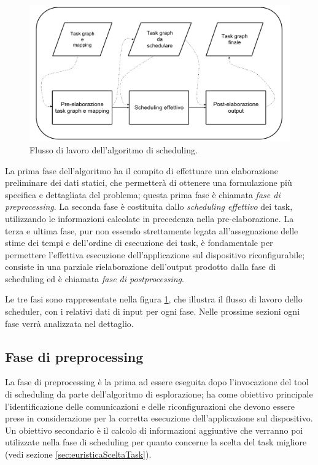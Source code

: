 \begin{figure}[ht]
 \begin{center}
\includegraphics[width=\textwidth]
{capitoli/figure/cap4/SchedulerWorkflow.pdf}
  \caption{Flusso di lavoro dell'algoritmo di scheduling.}
  \label{fig:schedulerWorkflow}
 \end{center}
\end{figure}


La prima fase dell'algoritmo ha il compito di 
effettuare una elaborazione preliminare dei dati statici, che permetterà di 
ottenere una formulazione più specifica e dettagliata del problema; questa 
prima fase è chiamata \emph{fase di preprocessing}. La seconda fase è 
costituita dallo \emph{scheduling effettivo} dei task, utilizzando le 
informazioni calcolate in precedenza nella pre-elaborazione. La terza e ultima 
fase, pur non essendo strettamente legata all'assegnazione delle stime dei tempi 
e dell'ordine di esecuzione dei task, è fondamentale per permettere l'effettiva 
esecuzione dell'applicazione sul dispositivo riconfigurabile; consiste in una 
parziale rielaborazione dell'output prodotto dalla fase di scheduling ed è 
chiamata \emph{fase di postprocessing}.

Le tre fasi sono rappresentate nella figura \ref{fig:schedulerWorkflow}, che 
illustra il flusso di lavoro dello scheduler, con i relativi dati di input per 
ogni fase. Nelle prossime sezioni ogni fase verrà analizzata nel dettaglio.


\subsection{Fase di preprocessing}
\label{subsec:fasePreprocessing}
La fase di preprocessing è la prima ad essere eseguita dopo l'invocazione del 
tool di scheduling da parte dell'algoritmo di esplorazione; ha come obiettivo 
principale l'identificazione delle comunicazioni e delle riconfigurazioni che 
devono essere prese in considerazione per la corretta esecuzione 
dell'applicazione sul dispositivo. Un obiettivo secondario è il calcolo di 
informazioni aggiuntive che verranno poi utilizzate nella fase di scheduling 
per quanto concerne la scelta del task migliore (vedi sezione 
\ref{sec:euristicaSceltaTask}).


